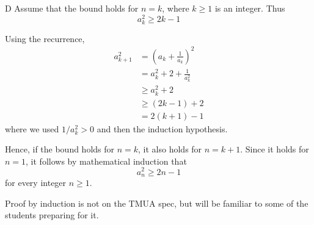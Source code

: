 \documentclass[11pt,a4paper]{article}
\begin{document}
\begin{enumerate}[label=\textbf{\arabic*.},leftmargin=*,itemsep=0pt,start=11]
\begin{djsSolution}{D}
Assume that the bound holds for $n=k$, where $k\geq1$ is an integer. Thus
\[
a_k^2\geq2k-1
\]

Using the recurrence,
\[
\begin{aligned}
a_{k+1}^2
&=\left(a_k+\frac{1}{a_k}\right)^2\\[8pt]
&=a_k^2+2+\frac{1}{a_k^2}\\[8pt]
&\geq a_k^2+2\\[8pt]
&\geq(2k-1)+2\\[8pt]
&=2(k+1)-1
\end{aligned}
\]
where we used $1/a_k^2>0$ and then the induction hypothesis.

Hence, if the bound holds for $n=k$, it also holds for $n=k+1$. Since it holds for $n=1$, it follows by mathematical induction that
\[
a_n^2\geq2n-1
\]
for every integer $n\geq1$.

Proof by induction is not on the TMUA spec, but will be familiar to some of the students preparing for it. 
\end{djsSolution}
\end{enumerate}
\clearpage
\thispagestyle{djssolutions}
\vspace*{8pt}
\end{document}
